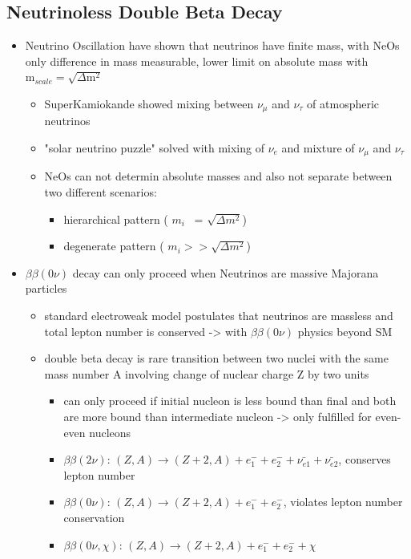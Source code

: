 \subsection{Neutrinoless Double Beta Decay}
\label{sec:NDBD}
\begin{itemize}
\item Neutrino Oscillation have shown that neutrinos have finite mass, with NeOs only difference in mass measurable, lower limit on absolute mass with \(\mathrm{m}_{scale} = \sqrt{\Delta \mathrm{m}^2}\)
\begin{itemize}
\item SuperKamiokande showed mixing between \(\nu_\mu\) and \(\nu_\tau\) of atmospheric neutrinos
\item "solar neutrino puzzle" solved with mixing of \(\nu_e\) and mixture of \(\nu_\mu\) and \(\nu_\tau\)
\item NeOs can not determin absolute masses and also not separate between two different scenarios:
\begin{itemize}
\item hierarchical pattern ( \(m_i\)  ~= \(\sqrt{\Delta m^2}\))
\item degenerate pattern ( \(m_i >> \sqrt{\Delta m^2}\))
\end{itemize}
\end{itemize}
\item \(\beta\beta(0\nu)\) decay can only proceed when Neutrinos are massive Majorana particles
\begin{itemize}
\item standard electroweak model postulates that neutrinos are massless and total lepton number is conserved -> with \(\beta\beta(0\nu)\) physics beyond SM
\item double beta decay is rare transition between two nuclei with the same mass number A involving change of nuclear charge Z by two units
\begin{itemize}
\item can only proceed if initial nucleon is less bound than final and both are more bound than intermediate nucleon -> only fulfilled for even-even nucleons
\item \(\beta\beta(2\nu)\): \( (Z,A) \rightarrow (Z + 2, A) + e^-_1 + e^-_2 + \bar{\nu_{e1}} + \bar{\nu_{e2}} \), conserves lepton number
\item \(\beta\beta(0\nu)\): \( (Z,A) \rightarrow (Z + 2, A) + e^-_1 + e^-_2\), violates lepton number conservation
\item \(\beta\beta(0\nu, \chi)\): \((Z,A) \rightarrow (Z + 2, A) + e^-_1 + e^-_2 + \chi \)

\end{itemize}
\end{itemize}
\end{itemize}
